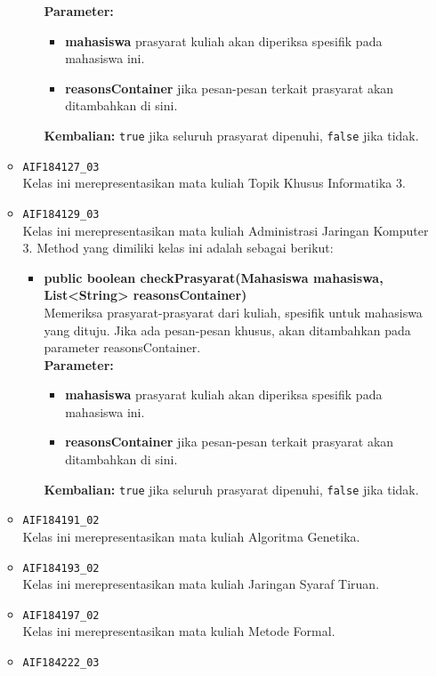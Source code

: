\begin{enumerate}
\begin{itemize}
\begin{itemize}
			\textbf{Parameter:}
			\begin{itemize}
				\item \textbf{mahasiswa} prasyarat kuliah akan diperiksa spesifik pada mahasiswa ini.
				\item \textbf{reasonsContainer} jika pesan-pesan terkait prasyarat akan ditambahkan di sini.
			\end{itemize}
			\textbf{Kembalian:} \texttt{true} jika seluruh prasyarat dipenuhi, \texttt{false} jika tidak.
		\end{itemize}
		\item \texttt{AIF184127\_03} \\
		Kelas ini merepresentasikan mata kuliah Topik Khusus Informatika 3.
		\item \texttt{AIF184129\_03} \\
		Kelas ini merepresentasikan mata kuliah Administrasi Jaringan Komputer 3. Method yang dimiliki kelas ini adalah sebagai berikut: 
		\begin{itemize}
			\item \textbf{public boolean checkPrasyarat(Mahasiswa mahasiswa, List<String> reasonsContainer)}\\
			Memeriksa prasyarat-prasyarat dari kuliah, spesifik untuk mahasiswa yang dituju. Jika ada pesan-pesan khusus, akan ditambahkan pada parameter reasonsContainer.\\
			\textbf{Parameter:}
			\begin{itemize}
				\item \textbf{mahasiswa} prasyarat kuliah akan diperiksa spesifik pada mahasiswa ini.
				\item \textbf{reasonsContainer} jika pesan-pesan terkait prasyarat akan ditambahkan di sini.
			\end{itemize}
			\textbf{Kembalian:} \texttt{true} jika seluruh prasyarat dipenuhi, \texttt{false} jika tidak.
		\end{itemize}
		\item \texttt{AIF184191\_02} \\
		Kelas ini merepresentasikan mata kuliah Algoritma Genetika.
		\item \texttt{AIF184193\_02} \\
		Kelas ini merepresentasikan mata kuliah Jaringan Syaraf Tiruan.
		\item \texttt{AIF184197\_02} \\
		Kelas ini merepresentasikan mata kuliah Metode Formal.
		\item \texttt{AIF184222\_03} \\

\end{itemize}
\end{enumerate}
